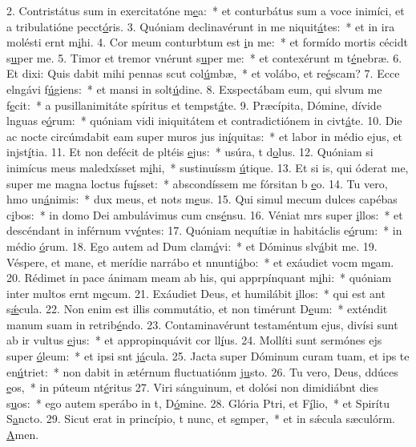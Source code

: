 2. Contristátus sum in exercitatóne m\uline{e}a:~* et conturbátus sum a voce inimíci, et a tribulatióne pecct\uline{ó}ris.
3. Quóniam declinavérunt in me niquit\uline{á}tes:~* et in ira molésti ernt m\uline{i}hi.
4. Cor meum conturbtum est \uline{i}n me:~* et formído mortis cécidt s\uline{u}per me.
5. Timor et tremor vnérunt s\uline{u}per me:~* et contexérunt m t\uline{é}nebræ.
6. Et dixi: Quis dabit mihi pennas scut col\uline{ú}mbæ,~* et volábo, et re\uline{é}scam?
7. Ecce elngávi f\uline{ú}giens:~* et mansi in solt\uline{ú}dine.
8. Exspectábam eum, qui slvum me f\uline{e}cit:~* a pusillanimitáte spíritus et tempst\uline{á}te.
9. Præcípita, Dómine, dívide lnguas e\uline{ó}rum:~* quóniam vidi iniquitátem et contradictiónem in civt\uline{á}te.
10. Die ac nocte circúmdabit eam super muros jus in\uline{í}quitas:~* et labor in médio ejus, et injst\uline{í}tia.
11. Et non defécit de pltéis \uline{e}jus:~* usúra, t d\uline{o}lus.
12. Quóniam si inimícus meus maledxísset m\uline{i}hi,~* sustinuíssm \uline{ú}tique.
13. Et si is, qui óderat me, super me magna loctus fu\uline{í}sset:~* abscondíssem me fórsitan b \uline{e}o.
14. Tu vero, hmo un\uline{á}nimis:~* dux meus, et nots m\uline{e}us.
15. Qui simul mecum dulces capébas c\uline{i}bos:~* in domo Dei ambulávimus cum cns\uline{é}nsu.
16. Véniat mrs super \uline{i}llos:~* et descéndant in inférnum vv\uline{é}ntes:
17. Quóniam nequítiæ in habitáclis e\uline{ó}rum:~* in médio \uline{ó}rum.
18. Ego autem ad Dum clam\uline{á}vi:~* et Dóminus slv\uline{á}bit me.
19. Véspere, et mane, et merídie narrábo et nnunti\uline{á}bo:~* et exáudiet vocm m\uline{e}am.
20. Rédimet in pace ánimam meam ab his, qui apprpínquant m\uline{i}hi:~* quóniam inter multos ernt m\uline{e}cum.
21. Exáudiet Deus, et humilábit \uline{i}llos:~* qui est ant s\uline{ǽ}cula.
22. Non enim est illis commutátio, et non timérunt D\uline{e}um:~* exténdit manum suam in retrib\uline{é}ndo.
23. Contaminavérunt testaméntum ejus, divísi sunt ab ir vultus \uline{e}jus:~* et appropinquávit cor ll\uline{í}us.
24. Mollíti sunt sermónes ejs super \uline{ó}leum:~* et ipsi snt j\uline{á}cula.
25. Jacta super Dóminum curam tuam, et ips te en\uline{ú}triet:~* non dabit in ætérnum fluctuatiónm j\uline{u}sto.
26. Tu vero, Deus, ddúces \uline{e}os,~* in púteum nt\uline{é}ritus
27. Viri sánguinum, et dolósi non dimidiábnt dies s\uline{u}os:~* ego autem sperábo in t, D\uline{ó}mine.
28. Glória Ptri, et F\uline{í}lio,~* et Spirítu S\uline{a}ncto.
29. Sicut erat in princípio, t nunc, et s\uline{e}mper,~* et in sǽcula sæculórm. \uline{A}men.
